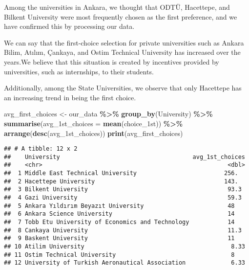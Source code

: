 \documentclass[
]{article}
\newenvironment{Shaded}{\begin{snugshade}}{\end{snugshade}}
\newcommand{\AttributeTok}[1]{\textcolor[rgb]{0.13,0.29,0.53}{#1}}
\newcommand{\FunctionTok}[1]{\textcolor[rgb]{0.13,0.29,0.53}{\textbf{#1}}}
\newcommand{\NormalTok}[1]{#1}
\newcommand{\OtherTok}[1]{\textcolor[rgb]{0.56,0.35,0.01}{#1}}
\newcommand{\SpecialCharTok}[1]{\textcolor[rgb]{0.81,0.36,0.00}{\textbf{#1}}}
\begin{document}
Among the universities in Ankara, we thought that ODTÜ, Hacettepe, and
Bilkent University were most frequently chosen as the first preference,
and we have confirmed this by processing our data.

We can say that the first-choice selection for private universities such
as Ankara Bilim, Atılım, Çankaya, and Ostim Technical University has
increased over the years.We believe that this situation is created by
incentives provided by universities, such as internships, to their
students.

Additionally, among the State Universities, we observe that only
Hacettepe has an increasing trend in being the first choice.

\begin{Shaded}
\begin{Highlighting}[]
\NormalTok{avg\_first\_choices }\OtherTok{\textless{}{-}}\NormalTok{ our\_data }\SpecialCharTok{\%\textgreater{}\%} \FunctionTok{group\_by}\NormalTok{(University) }\SpecialCharTok{\%\textgreater{}\%} 
  \FunctionTok{summarise}\NormalTok{(}\AttributeTok{avg\_1st\_choices =} \FunctionTok{mean}\NormalTok{(choice\_1st)) }\SpecialCharTok{\%\textgreater{}\%}
  \FunctionTok{arrange}\NormalTok{(}\FunctionTok{desc}\NormalTok{(avg\_1st\_choices))}
\FunctionTok{print}\NormalTok{(avg\_first\_choices)}
\end{Highlighting}
\end{Shaded}

\begin{verbatim}
## # A tibble: 12 x 2
##    University                                      avg_1st_choices
##    <chr>                                                     <dbl>
##  1 Middle East Technical University                         256.  
##  2 Hacettepe University                                     143.  
##  3 Bilkent University                                        93.3 
##  4 Gazi University                                           59.3 
##  5 Ankara Yıldırım Beyazıt University                        48   
##  6 Ankara Science University                                 14   
##  7 Tobb Etu University of Economics and Technology           14   
##  8 Cankaya University                                        11.3 
##  9 Baskent University                                        11   
## 10 Atilim University                                          8.33
## 11 Ostim Technical University                                 8   
## 12 University of Turkish Aeronautical Association             6.33
\end{verbatim}
\end{document}
